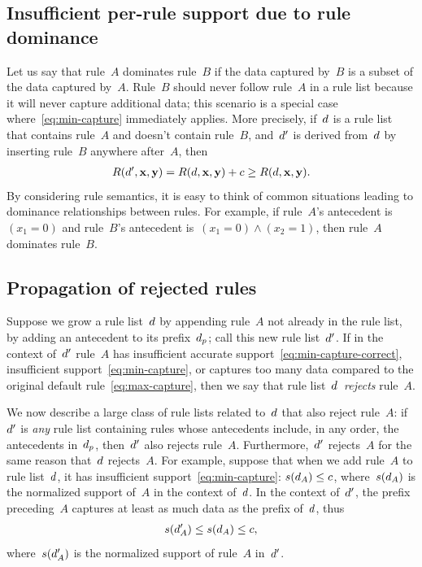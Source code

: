 \subsection{Insufficient per-rule support due to rule dominance}

Let us say that rule~$A$ dominates rule~$B$ if the data captured by~$B$ is a subset of the data captured by~$A$.
%
Rule~$B$ should never follow rule~$A$ in a rule list because it will never capture additional data;
this scenario is a special case where~\eqref{eq:min-capture} immediately applies.
%
More precisely, if~${d}$ is a rule list that contains rule~$A$ and doesn't contain rule~$B$,
and~${d}'$ is derived from~${d}$ by inserting rule~$B$ anywhere after~$A$, then
\begin{align}
\Obj(\RL', \x, \y) = \Obj(\RL, \x, \y) + c \ge \Obj(\RL, \x, \y).
\end{align}
By considering rule semantics, it is easy to think of common situations
leading to dominance relationships between rules.
%
For example, if rule~$A$'s antecedent is~${(x_1 = 0)}$ and rule~$B$'s
antecedent is~${(x_1 = 0) \wedge (x_2 = 1)}$, then rule~$A$ dominates rule~$B$.
%

\subsection{Propagation of rejected rules}

Suppose we grow a rule list~${d}$ by appending rule~$A$ not already in the rule list,
\ie by adding an antecedent to its prefix~$d_p$; call this new rule list~${d}'$.
%
If in the context of~${d}'$ rule~$A$ has insufficient accurate support~\eqref{eq:min-capture-correct},
insufficient support~\eqref{eq:min-capture},
or captures too many data compared to the original default rule~\eqref{eq:max-capture},
then we say that rule list~${d}$~\emph{rejects} rule~$A$.

We now describe a large class of rule lists related to~${d}$ that also reject rule~$A$:
if~${d}'$ is \emph{any} rule list containing rules whose antecedents include,
in any order, the antecedents in~$d_p$, then~${d}'$ also rejects rule~$A$.
%
Furthermore,~${d}'$ rejects~$A$ for the same reason that~${d}$ rejects~$A$.
%
For example, suppose that when we add rule~$A$ to rule list~${d}$,
it has insufficient support~\eqref{eq:min-capture}: ${s({d}_A) \le c}$,
where~$s({d}_A)$ is the normalized support of~$A$ in the context of~${d}$.
%
In the context of~${d}'$, the prefix preceding~$A$ captures at least
as much data as the prefix of~${d}$, thus
\begin{align}
s(\RL'_A) \le s(\RL_A) \le c,
\end{align}
where~$s({d}'_A)$ is the normalized support of rule~$A$ in~${d}'$.

